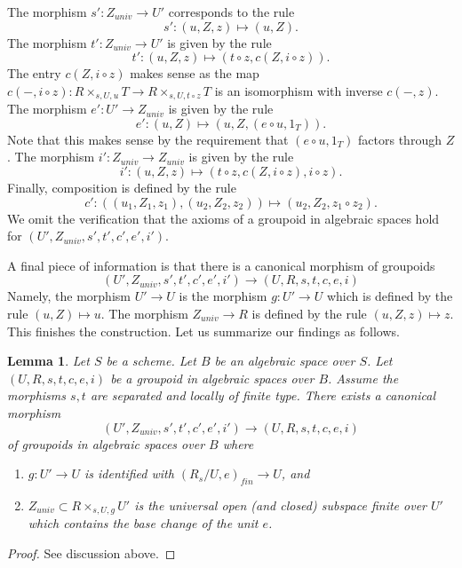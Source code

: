 \documentclass{stacks-project}
\theoremstyle{plain}
\newtheorem{lemma}[subsection]{Lemma}
\theoremstyle{definition}
\theoremstyle{remark}
\numberwithin{equation}{subsection}
\begin{document}
\medskip\noindent
The morphism $s' : Z_{univ} \to U'$ corresponds to the rule
$$
s' : (u, Z, z) \mapsto (u, Z).
$$
The morphism $t' : Z_{univ} \to U'$ is given by the rule
$$
t' : (u, Z, z) \mapsto (t \circ z, c(Z, i \circ z)).
$$
The entry $c(Z, i \circ z)$
makes sense as the map
$c(-, i \circ z) : R \times_{s, U, u} T \to R \times_{s, U, t \circ z} T$
is an isomorphism with inverse $c(-, z)$.
The morphism $e' : U' \to Z_{univ}$ is given by the rule
$$
e' : (u, Z) \mapsto (u, Z, (e \circ u, 1_T)).
$$
Note that this makes sense by the requirement that $(e \circ u, 1_T)$
factors through $Z$.
The morphism $i' : Z_{univ} \to Z_{univ}$ is given by the rule
$$
i' : (u, Z, z) \mapsto (t \circ z, c(Z, i \circ z), i \circ z).
$$
Finally, composition is defined by the rule
$$
c' : ((u_1, Z_1, z_1), (u_2, Z_2, z_2)) \mapsto (u_2, Z_2, z_1 \circ z_2).
$$
We omit the verification that the axioms of a groupoid in algebraic
spaces hold for $(U', Z_{univ}, s', t', c', e', i')$.

\medskip\noindent
A final piece of information is that there is a canonical morphism
of groupoids
$$
(U', Z_{univ}, s', t', c', e', i')
\longrightarrow
(U, R, s, t, c, e, i)
$$
Namely, the morphism $U' \to U$ is the morphism $g : U' \to U$
which is defined by the rule $(u, Z) \mapsto u$. The morphism
$Z_{univ} \to R$ is defined by the rule $(u, Z, z) \mapsto z$.
This finishes the construction. Let us summarize our findings as
follows.

\begin{lemma}
\label{lemma-finite-part-groupoid}
Let $S$ be a scheme.
Let $B$ be an algebraic space over $S$.
Let $(U, R, s, t, c, e, i)$ be a groupoid in algebraic spaces over $B$.
Assume the morphisms $s, t$ are separated and locally of finite type.
There exists a canonical morphism
$$
(U', Z_{univ}, s', t', c', e', i')
\longrightarrow
(U, R, s, t, c, e, i)
$$
of groupoids in algebraic spaces over $B$ where
\begin{enumerate}
\item $g : U' \to U$ is identified with $(R_s/U, e)_{fin} \to U$, and
\item $Z_{univ} \subset R \times_{s, U, g} U'$ is the universal
open (and closed) subspace finite over $U'$ which contains the base
change of the unit $e$.
\end{enumerate}
\end{lemma}

\begin{proof}
See discussion above.
\end{proof}
\end{document}

